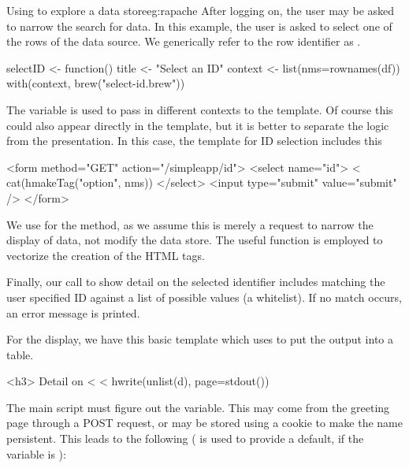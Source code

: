 \begin{example}{Using  to explore a data store}{eg:rapache}
After logging on, the user may be asked to narrow the search for
data. In this example, the user is asked to select one of the rows of
the data source. We generically refer to the row identifier as
. 
\begin{Schunk}
\begin{Sinput}
 selectID <- function() {
   title <- "Select an ID"
   context <- list(nms=rownames(df))   
   with(context, brew("select-id.brew"))
 }
\end{Sinput}
\end{Schunk}
The  variable is used to pass in
different contexts to the  template. Of course this could
also appear directly in the template, but it is better to separate the
logic from the presentation. In this case, the template for ID
selection includes this
\begin{HTMLinput}
<form method="GET" action="/simpleapp/id">
<select name="id">
<%
  cat(hmakeTag("option", nms)) 
</select>
<input type="submit" value="submit" />
</form>
\end{HTMLinput}
We use  for the method, as we assume this is merely a
request to narrow the display of data, not modify the data store. The
useful  function is employed to vectorize the
creation of the HTML  tags.

Finally, our call to show detail on the selected identifier includes
matching the user specified ID against a list of possible values (a
whitelist). If no match occurs, an error message is printed.
\begin{Schunk}
\end{Schunk}
For the display, we have this basic template which uses
 to put the output into a table.
\begin{HTMLinput}
<h3> Detail on <%
<%
  hwrite(unlist(d), page=stdout()) 
\end{HTMLinput}


The main script must figure out the  variable. This
may come from the greeting page through a POST request, or may be
stored using a cookie to make the name persistent. This leads to the
following ( is used to provide a default, if the variable
is ):
\begin{Schunk}
\end{Schunk}


\end{example}
